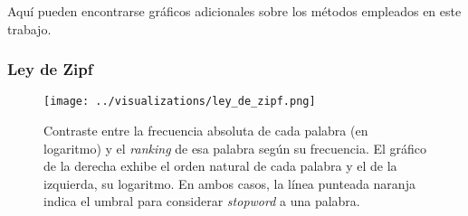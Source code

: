 Aquí pueden encontrarse gráficos adicionales sobre los métodos empleados
en este trabajo.

\subsubsection{Ley de Zipf}
\label{appendix-plots-zipf-law}
\begin{figure}[h!]
    \centering
    \texttt{[image: ../visualizations/ley\_de\_zipf.png]}
    \caption{Contraste entre la frecuencia absoluta de cada palabra (en logaritmo)
    y el \textit{ranking} de esa palabra según su frecuencia. El gráfico de la
    derecha exhibe el orden natural de cada palabra y el de la izquierda, su logaritmo.
    En ambos casos, la línea punteada naranja indica el umbral
    para considerar \textit{stopword} a una palabra.}
    \label{fig-zipf-law}
\end{figure}